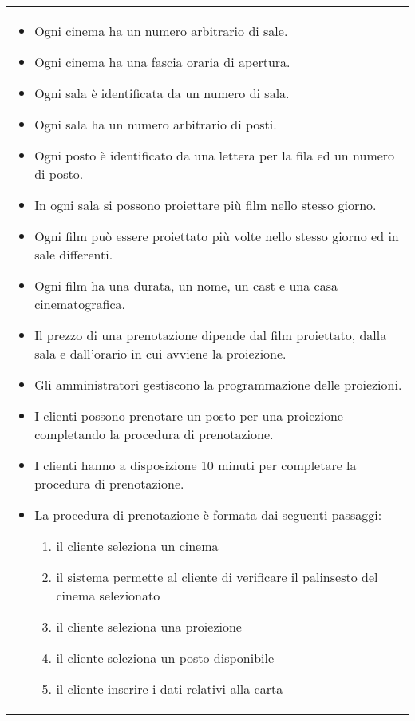 \begin{tabularx}{\linewidth}{|X|}
    \hline
    \begin{itemize}
        \item Ogni cinema ha un numero arbitrario di sale.
        \item Ogni cinema ha una fascia oraria di apertura.
        \item Ogni sala è identificata da un numero di sala.
        \item Ogni sala ha un numero arbitrario di posti.
        \item Ogni posto è identificato da una lettera per la fila ed un numero
              di posto.
        \item In ogni sala si possono proiettare più film nello stesso giorno.
        \item Ogni film può essere proiettato più volte nello stesso giorno ed
              in sale differenti.
        \item Ogni film ha una durata, un nome, un cast e una
              casa cinematografica.
        \item Il prezzo di una prenotazione dipende dal film proiettato,
              dalla sala e dall'orario in cui avviene la proiezione.
        \item Gli amministratori gestiscono la programmazione delle proiezioni.
        \item I clienti possono prenotare un posto per una proiezione
              completando la procedura di prenotazione.
        \item I clienti hanno a disposizione 10 minuti per completare la
              procedura di prenotazione.
        \item La procedura di prenotazione è formata dai seguenti passaggi:
              \begin{enumerate}
                  \item il cliente seleziona un cinema
                  \item il sistema permette al cliente di verificare
                        il palinsesto del cinema selezionato
                  \item il cliente seleziona una proiezione
                  \item il cliente seleziona un posto disponibile
                  \item il cliente inserire i dati relativi alla carta

\end{enumerate}
\end{itemize}
\end{tabularx}
